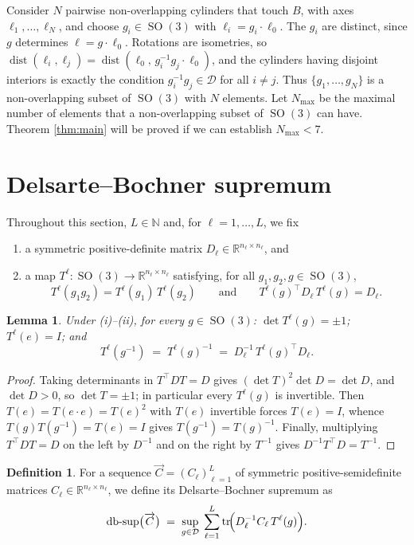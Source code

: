 \documentclass[reqno]{amsart}
\newtheorem{lemma}[theorem]{Lemma}
\theoremstyle{definition}
\newtheorem{definition}[theorem]{Definition}
\DeclareMathOperator{\SO}{SO}
\DeclareMathOperator{\tr}{tr}
\DeclareMathOperator{\dist}{dist}
\DeclareMathOperator{\dbsup}{db\text{-}sup}
\newcommand{\R}{\mathbb{R}}
\newcommand{\Dom}{\mathcal{D}}
\begin{document}
Consider $N$ pairwise non-overlapping cylinders that touch $B$, with axes
$\ell_1,\dots,\ell_N$, and choose $g_i\in\SO(3)$ with $\ell_i=g_i\cdot\ell_0$. The $g_i$ are
distinct, since $g$ determines $\ell=g\cdot\ell_0$. Rotations are isometries, so
$\dist(\ell_i,\ell_j)=\dist(\ell_0,\,g_i^{-1}g_j\cdot\ell_0)$, and the cylinders having disjoint
interiors is exactly the condition $g_i^{-1}g_j\in\Dom$ for all $i\ne j$. Thus
$\{g_1,\dots,g_N\}$ is a non-overlapping subset of $\SO(3)$ with $N$ elements.
Let $N_{\max}$ be the maximal number of elements that a non-overlapping subset of $\SO(3)$ can
have. Theorem \ref{thm:main} will be proved if we can establish $N_{\max}<7$.


\section{Delsarte--Bochner supremum}\label{sec:DBSequence}

Throughout this section, $L\in\mathbb N$ and, for $\ell=1,\dots,L$, we fix
\begin{enumerate}[leftmargin=2.2em,label=(\roman*)]
\item a symmetric positive-definite matrix $D_\ell\in\R^{n_\ell\times n_\ell}$, and
\item a map $T^\ell:\SO(3)\to\R^{n_\ell\times n_\ell}$ satisfying, for all $g_1,g_2,g\in\SO(3)$,
\[
T^\ell(g_1g_2)=T^\ell(g_1)\,T^\ell(g_2)
\qquad\text{and}\qquad
T^\ell(g)^\top D_\ell\, T^\ell(g)=D_\ell .
\]
\end{enumerate}

\begin{lemma}\label{lem:Torth}
Under (i)--(ii), for every $g\in\SO(3)$: $\det T^\ell(g)=\pm1$; $T^\ell(e)=I$; and
\[
T^\ell(g^{-1})\;=\;T^\ell(g)^{-1}\;=\;D_\ell^{-1}\,T^\ell(g)^\top D_\ell .
\]
\end{lemma}
\begin{proof}
Taking determinants in $T^\top D T=D$ gives $(\det T)^2\det D=\det D$, and $\det D>0$, so
$\det T=\pm1$; in particular every $T^\ell(g)$ is invertible. Then $T(e)=T(e\cdot e)=T(e)^2$ with
$T(e)$ invertible forces $T(e)=I$, whence $T(g)T(g^{-1})=T(e)=I$ gives $T(g^{-1})=T(g)^{-1}$.
Finally, multiplying $T^\top DT=D$ on the left by $D^{-1}$ and on the right by $T^{-1}$ gives
$D^{-1}T^\top D=T^{-1}$.
\end{proof}

\begin{definition}\label{def:DB}
For a sequence $\overrightarrow C=(C_\ell)_{\ell=1}^{L}$ of symmetric positive-semidefinite matrices
$C_\ell\in\R^{n_\ell\times n_\ell}$, we define its Delsarte--Bochner supremum as
\[
\dbsup\bigl(\overrightarrow C\bigr)\;=\;\sup_{g\in\Dom}\;\sum_{\ell=1}^{L}
\tr\!\Bigl(D_\ell^{-1}C_\ell\,T^\ell(g)\Bigr).
\]
\end{definition}
\end{document}

